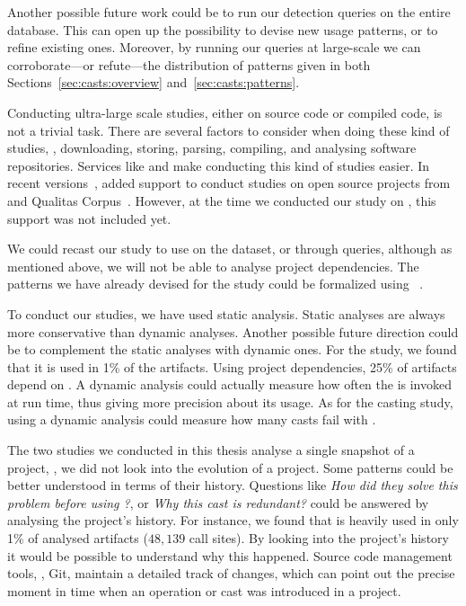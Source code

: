 Another possible future work could be to run our detection queries on the entire \lgtm{} database.
This can open up the possibility to devise new usage patterns,
or to refine existing ones.
Moreover,
by running our queries at large-scale we can corroborate---or refute---the distribution of patterns given in both Sections~\ref{sec:casts:overview} and~\ref{sec:casts:patterns}.

Conducting ultra-large scale studies, either on source code or compiled code, is not a trivial task.
There are several factors to consider when doing these kind of studies,
\eg{}, downloading, storing, parsing, compiling,
and analysing software repositories.
Services like \boa{} and \lgtm{} make conducting this kind of studies easier.
In recent versions~\citep{boa-github},
\boa{} added support to conduct studies on open source projects from \github{} and Qualitas Corpus~\citep{temperoQualitasCorpusCurated2010}.
However, at the time we conducted our study on \unsafe{},
this support was not included yet.

We could recast our \unsafe{} study to use \boa{} on the \github{} dataset,
or \lgtm{} through \ql{} queries, although as mentioned above,
we will not be able to analyse project dependencies.
The patterns we have already devised for the \unsafe{} study could be formalized using \ql{}~\citep{avgustinovQLObjectorientedQueries2016}.

To conduct our studies, we have used static analysis.
Static analyses are always more conservative than dynamic analyses.
Another possible future direction could be to complement the static analyses with dynamic ones.
For the \unsafe{} study,
we found that it is used in 1\% of the \mavencentral{} artifacts.
Using project dependencies, 25\% of artifacts depend on \smu{}.
A dynamic analysis could actually measure how often the \unsafe{} \api{} is invoked at run time,
thus giving more precision about its usage.
As for the casting study,
using a dynamic analysis could measure how many casts fail with .

The two studies we conducted in this thesis analyse a single snapshot of a project,
\ie{}, we did not look into the evolution of a project.
Some patterns could be better understood in terms of their history.
Questions like
\emph{How did they solve this problem before using \unsafe{}?},
or \emph{Why this cast is redundant?}
could be answered by analysing the project's history. 
For instance,
we found that \smu{} is heavily used in only 1\% of analysed artifacts
($48,139$ call sites).
By looking into the project's history it would be possible to understand why this happened.
Source code management tools, \eg{}, Git,
maintain a detailed track of changes,
which can point out the precise moment in time when an \unsafe{} operation or cast was introduced in a project.

